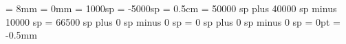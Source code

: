 
\gre@abovesignsspace = 8mm
\gre@belowsignsspace = 0mm
\gre@lowchoralsignshift = 1000sp
\gre@highchoralsignshift = -5000sp
\gre@translationheight = 0.5cm
\gre@spaceabovelines = 50000 sp plus 40000 sp minus 10000 sp
\gre@spacelinestext = 66500 sp plus 0 sp minus 0 sp
\gre@spacebeneathtext = 0 sp plus 0 sp minus 0 sp
\gre@abovelinestextraise=-1mm%
\gre@abovelinestextheight=3mm%
\gre@braceshift = 0pt
\gre@curlybraceaccentusshift = -0.5mm

